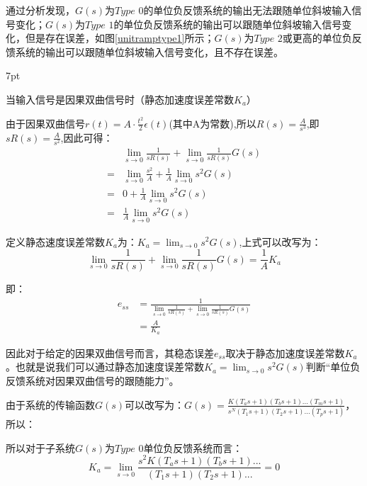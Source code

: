 \documentclass{article}
\numberwithin{equation}{section}
\numberwithin{figure}{section}
\newenvironment{formal}{%
\def\FrameCommand{%
\hspace{1pt}%
{\color{DarkBlue}\vrule width 2pt}%
{\color{formalshade}\vrule width 4pt}%
\colorbox{formalshade}%
}%
\MakeFramed{\advance\hsize-\width\FrameRestore}%
\noindent\hspace{-4.55pt}%
\begin{adjustwidth}{}{7pt}%
\vspace{2pt}\vspace{2pt}%
}
{%
\vspace{2pt}\end{adjustwidth}\endMakeFramed%
}
\begin{document}
通过分析发现，$G(s)$为$Type$ $0$的单位负反馈系统的输出无法跟随单位斜坡输入信号变化；$G(s)$为$Type$ $1$的单位负反馈系统的输出可以跟随单位斜坡输入信号变化，但是存在误差，如图\ref{unitramptype1}所示；$G(s)$为$Type$ $2$或更高的单位负反馈系统的输出可以跟随单位斜坡输入信号变化，且不存在误差。

\begin{formal}
    当输入信号是因果双曲信号时（静态加速度误差常数$K_a$）
\end{formal}
由于因果双曲信号$r(t)=A·\frac{t^2}{2}\epsilon(t)$(其中A为常数),所以$R(s)=\frac{A}{s^3}$,即$sR(s)=\frac{A}{s^2}$,因此可得：
\begin{equation}
    \begin{split}
        &\lim_{s\rightarrow 0}\frac{1}{sR(s)}+\lim_{s\rightarrow 0}\frac{1}{sR(s)}G(s)\\
        =&\lim_{s\rightarrow 0}\frac{s^2}{A}+\frac{1}{A}\lim_{s\rightarrow 0}s^2G(s)\\
        =&0+\frac{1}{A}\lim_{s\rightarrow 0}s^2G(s)\\
        =&\frac{1}{A}\lim_{s\rightarrow 0}s^2G(s)
    \end{split}
\end{equation}

定义静态速度误差常数$K_a$为：$K_a=\lim_{s\rightarrow 0}s^2G(s)$,上式可以改写为：
\begin{equation}
    \lim_{s\rightarrow 0}\frac{1}{sR(s)}+\lim_{s\rightarrow 0}\frac{1}{sR(s)}G(s)=\frac{1}{A}K_a
\end{equation}

即：
\begin{equation}
    \begin{split}
        e_{ss}&=\frac{1}{\lim_{s\rightarrow 0}\frac{1}{sR(s)}+\lim_{s\rightarrow 0}\frac{1}{sR(s)}G(s)}\\
        &=\frac{A}{K_a}
    \end{split}
\end{equation}

因此对于给定的因果双曲信号而言，其稳态误差$e_{ss}$取决于静态加速度误差常数$K_a$。也就是说我们可以通过静态加速度误差常数$K_a=\lim_{s\rightarrow 0}s^2G(s)$判断“单位负反馈系统对因果双曲信号的跟随能力”。

由于系统的传输函数$G(s)$可以改写为：$G(s)=\frac{K(T_as+1)(T_bs+1)...(T_ms+1)}{s^N(T_1s+1)(T_2s+1)...(T_ps+1)}$，所以：

所以对于子系统$G(s)$为$Type$ $0$单位负反馈系统而言：
\begin{equation}
    K_a=\lim_{s\rightarrow 0}\frac{s^2K(T_as+1)(T_bs+1)...}{(T_1s+1)(T_2s+1)...}=0
\end{equation}
\end{document}
